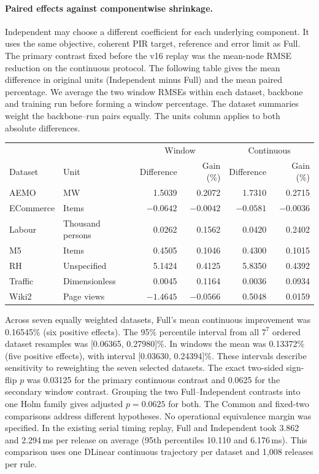 \paragraph{Paired effects against componentwise shrinkage.}
Independent may choose a different coefficient for each underlying component. It uses the same objective, coherent PIR target, reference and error limit as Full. The primary contrast fixed before the v16 replay was the mean-node RMSE reduction on the continuous protocol. The following table gives the mean difference in original units (Independent minus Full) and the mean paired percentage. We average the two window RMSEs within each dataset, backbone and training run before forming a window percentage. The dataset summaries weight the backbone--run pairs equally. The units column applies to both absolute differences.

\begin{center}\small
\begin{tabular}{llrrrr}\toprule
 & & \multicolumn{2}{c}{Window} &\multicolumn{2}{c}{Continuous}\\
Dataset & Unit & Difference & Gain (\%) & Difference & Gain (\%)\\\midrule
AEMO & MW & 1.5039 & 0.2072 & 1.7310 & 0.2715\\
ECommerce & Items & $-0.0642$ & $-0.0042$ & $-0.0581$ & $-0.0036$\\
Labour & Thousand persons & 0.0262 & 0.1562 & 0.0420 & 0.2402\\
M5 & Items & 0.4505 & 0.1046 & 0.4300 & 0.1015\\
RH & Unspecified & 5.1424 & 0.4125 & 5.8350 & 0.4392\\
Traffic & Dimensionless & 0.0045 & 0.1164 & 0.0036 & 0.0934\\
Wiki2 & Page views & $-1.4645$ & $-0.0566$ & 0.5048 & 0.0159\\\bottomrule
\end{tabular}\end{center}

Across seven equally weighted datasets, Full's mean continuous improvement was 0.16545\% (six positive effects). The 95\% percentile interval from all $7^7$ ordered dataset resamples was [0.06365, 0.27980]\%. In windows the mean was 0.13372\% (five positive effects), with interval [0.03630, 0.24394]\%. These intervals describe sensitivity to reweighting the seven selected datasets. The exact two-sided sign-flip $p$ was 0.03125 for the primary continuous contrast and 0.0625 for the secondary window contrast. Grouping the two Full--Independent contrasts into one Holm family gives adjusted $p=0.0625$ for both. The Common and fixed-two comparisons address different hypotheses. No operational equivalence margin was specified. In the existing serial timing replay, Full and Independent took 3.862 and 2.294\,ms per release on average (95th percentiles 10.110 and 6.176\,ms). This comparison uses one DLinear continuous trajectory per dataset and 1,008 releases per rule.

